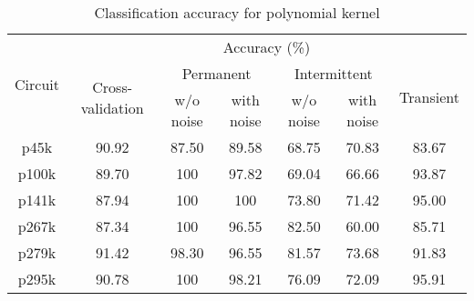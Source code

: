 \begin{table}[h]

	\captionsetup{justification=centering}
\begin{tabular}{ccccccc}
\hline
\multirow{3}{*}{Circuit} & \multicolumn{6}{c}{Accuracy (\%)}\\ \cline{2-7} 
                         & \multirow{2}{*}{Cross-validation} & \multicolumn{2}{c}{Permanent} & \multicolumn{2}{c}{Intermittent} & \multirow{2}{*}{Transient} \\ \cline{3-6}
                         &                                   & w/o noise     & with noise    & w/o noise      & with noise      &                            \\ \hline
p45k                     & 90.92                             & 87.50         & 89.58         & 68.75          & 70.83           & 83.67                      \\
p100k                    & 89.70                             & 100           & 97.82         & 69.04          & 66.66           & 93.87                      \\
p141k                    & 87.94                             & 100           & 100           & 73.80          & 71.42           & 95.00                      \\
p267k                    & 87.34                             & 100           & 96.55         & 82.50          & 60.00           & 85.71                      \\
p279k                    & 91.42                             & 98.30         & 96.55         & 81.57          & 73.68           & 91.83                      \\
p295k                    & 90.78                             & 100           & 98.21         & 76.09          & 72.09           & 95.91      \\
\hline                                                     
\end{tabular}
\caption {Classification accuracy for polynomial kernel}
\label{tab:polywp}
\end{table}

